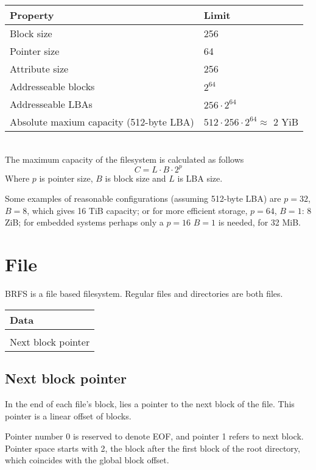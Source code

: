 \documentclass[]{article}
\begin{document}
	\begin{tabular}{|l|l|} 
		\hline
		\textbf{Property} & \textbf{Limit} \\ [0.5ex] 
		\hline
		Block size & 256 \\ 
		\hline
		Pointer size & 64 \\
		\hline
		Attribute size & 256 \\
		\hline
		Addresseable blocks & $2^{64}$ \\
		\hline	
		Addresseable LBAs & $256 \cdot 2^{64}$ \\
		\hline
		Absolute maxium capacity (512-byte LBA) & $512 \cdot 256 \cdot 2^{64} \approx $ 2 YiB \\
		\hline
	\end{tabular}\\

	The maximum capacity of the filesystem is calculated as follows
	\begin{equation}
		C = L \cdot B \cdot 2^p
	\end{equation}
	Where $p$ is pointer size, $B$ is block size and $L$ is LBA size.
	
	Some examples of reasonable configurations (assuming 512-byte LBA) are $p = 32$, $B = 8$, which gives 16 TiB capacity; or for more efficient storage, $p = 64$, $B = 1$: 8 ZiB; for embedded systems perhaps only a $p = 16$ $B = 1$ is needed, for 32 MiB.

	\section{File}
	
	BRFS is a file based filesystem. Regular files and directories are both files. 
	
	\begin{tabular}{|l|} 
		\hline
		Data \\
		\hline
		[Padding] \\
		\hline
		Next block pointer \\
		\hline
	\end{tabular}

	\subsection{Next block pointer}
	In the end of each file's block, lies a pointer to the next block of the file. This pointer is a linear offset of blocks.
	
	Pointer number 0 is reserved to denote EOF, and pointer 1 refers to next block. Pointer space starts with 2, the block after the first block of the root directory, which coincides with the global block offset.
	
\end{document}
